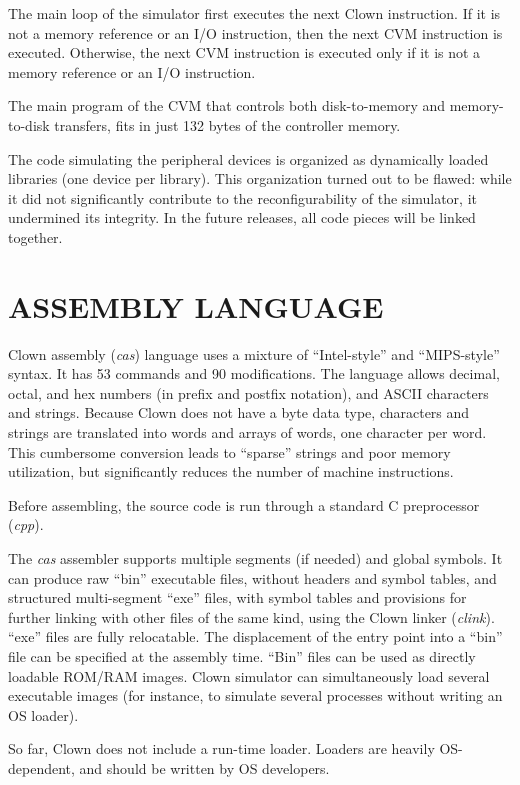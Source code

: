 \documentclass[10pt,twoside]{article}
\begin{document}
The main loop of the simulator first executes the next Clown
instruction. If it is not a memory reference or an I/O instruction,
then the next CVM instruction is executed. Otherwise, the next
CVM instruction is executed only if it is not a memory reference
or an I/O instruction. 

The main program of the CVM that controls both disk-to-memory and
memory-to-disk transfers, fits in just 132 bytes of the controller
memory.

The code simulating the peripheral devices is organized as dynamically
loaded libraries (one device per library). This organization turned
out to be flawed: while it did not significantly contribute to the
reconfigurability of the simulator, it undermined its integrity. In
the future releases, all code pieces will be linked together.

\section{ASSEMBLY LANGUAGE}

Clown assembly ({\em cas}) language uses a mixture of ``Intel-style''
and ``MIPS-style'' syntax. It has 53 commands and 90
modifications. The language allows decimal, octal, and hex numbers (in
prefix and postfix notation), and ASCII characters and
strings. Because Clown does not have a byte data type, characters and
strings are translated into words and arrays of words, one character
per word. This cumbersome conversion leads to ``sparse'' strings and
poor memory utilization, but significantly reduces the number of
machine instructions.

Before assembling, the source code is run through a standard C
preprocessor ({\em cpp}).

The {\em cas} assembler supports multiple segments (if needed) and
global symbols. It can produce raw ``bin'' executable files, without
headers and symbol tables, and structured multi-segment ``exe'' files,
with symbol tables and provisions for further linking with other files
of the same kind, using the Clown linker ({\em clink}). ``exe'' files
are fully relocatable. The displacement of the entry point into a
``bin'' file can be specified at the assembly time. ``Bin'' files can
be used as directly loadable ROM/RAM images. Clown simulator can
simultaneously load several executable images (for instance, to
simulate several processes without writing an OS loader).

So far, Clown does not include a run-time loader. Loaders are heavily
OS-dependent, and should be written by OS developers.
\end{document}
